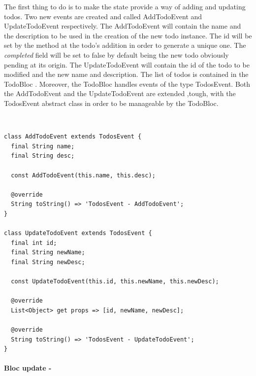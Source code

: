 The first thing to do is to make the state provide a way of adding and updating todos. Two new events are created and called AddTodoEvent and UpdateTodoEvent respectively. The AddTodoEvent will contain the name and the description to be used in the creation of the new todo instance. The id will be set by the method at the todo’s addition in order to generate a unique one. The \textit{completed} field will be set to false by default being the new todo obviously pending at its origin.  The UpdateTodoEvent will contain the id of the todo to be modified and the new name and description. The list of todos is contained in the TodoBloc . Moreover, the TodoBloc handles events of the type TodosEvent. Both the AddTodoEvent and the UpdateTodoEvent are extended ,tough, with the TodosEvent abstract class in order to be manageable by the TodoBloc.
\begin{code}
\mbox{}\\
 \mbox{}
\label{code:2.14}
\begin{verbatim}
class AddTodoEvent extends TodosEvent {
  final String name;
  final String desc;

  const AddTodoEvent(this.name, this.desc);

  @override
  String toString() => 'TodosEvent - AddTodoEvent';
}

class UpdateTodoEvent extends TodosEvent {
  final int id;
  final String newName;
  final String newDesc;

  const UpdateTodoEvent(this.id, this.newName, this.newDesc);

  @override
  List<Object> get props => [id, newName, newDesc];

  @override
  String toString() => 'TodosEvent - UpdateTodoEvent';
}
\end{verbatim}
\mbox{}
\end{code}
\paragraph{Bloc update - }
\label{subpar:todo_app_bloc_core_state}

